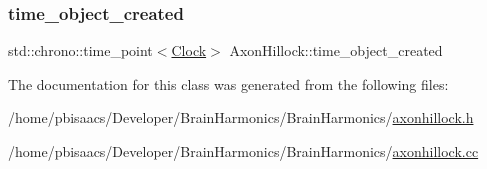 \subsubsection{\texorpdfstring{time\+\_\+object\+\_\+created}{time\_object\_created}}
{\footnotesize\ttfamily std\+::chrono\+::time\+\_\+point$<$\mbox{\hyperlink{universe_8h_a0ef8d951d1ca5ab3cfaf7ab4c7a6fd80}{Clock}}$>$ Axon\+Hillock\+::time\+\_\+object\+\_\+created\hspace{0.3cm}{\ttfamily [private]}}



The documentation for this class was generated from the following files\+:\begin{DoxyCompactItemize}
\item 
/home/pbisaacs/\+Developer/\+Brain\+Harmonics/\+Brain\+Harmonics/\mbox{\hyperlink{axonhillock_8h}{axonhillock.\+h}}\item 
/home/pbisaacs/\+Developer/\+Brain\+Harmonics/\+Brain\+Harmonics/\mbox{\hyperlink{axonhillock_8cc}{axonhillock.\+cc}}\end{DoxyCompactItemize}
